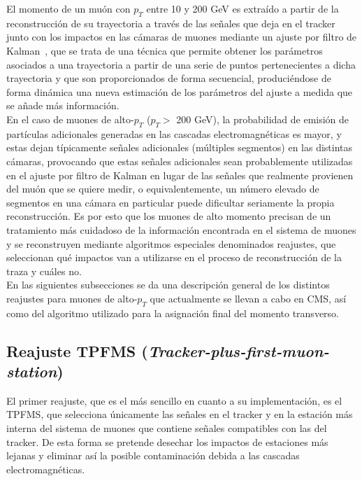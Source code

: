 
El momento de un mu\'on con $p_{T}$ entre 10 y 200 GeV es extra\'ido a partir de la reconstrucci\'on de su trayectoria a trav\'es de las se\~nales que deja en el tracker junto con los impactos en las c\'amaras de muones mediante un ajuste por filtro de Kalman~\cite{Kalman1960ANA}, que se trata de una t\'ecnica que permite obtener los par\'ametros asociados a una trayectoria a partir de una serie de puntos pertenecientes a dicha trayectoria y que son proporcionados de forma secuencial, produci\'endose de forma din\'amica una nueva estimaci\'on de los par\'ametros del ajuste a medida que se a\~nade m\'as informaci\'on. \\

En el caso de muones de alto-$p_{T}$ ($p_{T} > $ 200 GeV), la probabilidad de emisi\'on de part\'iculas adicionales generadas en las cascadas electromagn\'eticas es mayor, y estas dejan t\'ipicamente se\~nales adicionales (m\'ultiples segmentos) en las distintas c\'amaras, provocando que estas se\~nales adicionales sean probablemente utilizadas en el ajuste por filtro de Kalman en lugar de las se\~nales que realmente provienen del mu\'on que se quiere medir, o equivalentemente, un n\'umero elevado de segmentos en una c\'amara en particular puede dificultar seriamente la propia reconstrucci\'on. Es por esto que los muones de alto momento precisan de un tratamiento m\'as cuidadoso de la informaci\'on encontrada en el sistema de muones y se reconstruyen mediante algoritmos especiales denominados reajustes, que seleccionan qu\'e impactos van a utilizarse en el proceso de reconstrucci\'on de la traza y cu\'ales no. \\

En las siguientes subsecciones se da una descripci\'on general de los distintos reajustes para muones de alto-$p_{T}$ que actualmente se llevan a cabo en CMS, as\'i como del algoritmo utilizado para la asignaci\'on final del momento transverso.

\subsection{Reajuste TPFMS (\textit{Tracker-plus-first-muon-station})}\label{sec:TPFMS}

El primer reajuste, que es el m\'as sencillo en cuanto a su implementaci\'on, es el TPFMS, que selecciona \'unicamente las se\~nales en el tracker y en la estaci\'on m\'as interna del sistema de muones que contiene se\~nales compatibles con las del tracker. De esta forma se pretende desechar los impactos de estaciones m\'as lejanas y eliminar as\'i la posible contaminaci\'on debida a las cascadas electromagn\'eticas.

